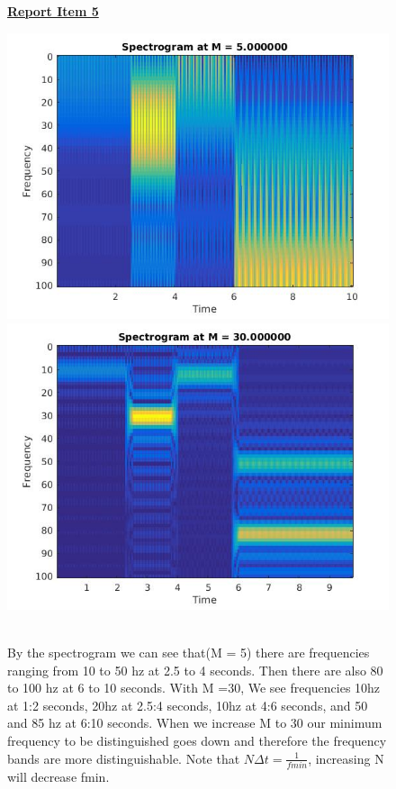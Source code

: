 \documentclass{article}
\begin{document}
\begin{figure}[H]
\color{red}
\underline{\textbf{Report Item 5}}
\color{black}

\includegraphics[scale = .4]{report5_1}
\includegraphics[scale = .4]{report5_2_2}
\end{figure}
\begin{figure}[H]
\\By the spectrogram we can see that(M = 5) there are frequencies ranging from 10 to 50 hz at 2.5 to 4 seconds. Then there are also 80 to 100 hz at 6 to 10 seconds. With M =30, We see frequencies 10hz at 1:2 seconds, 20hz at 2.5:4 seconds, 10hz at 4:6 seconds, and 50 and 85 hz at 6:10 seconds. When we increase M to 30 our minimum frequency to be distinguished goes down and therefore the frequency bands are more distinguishable. Note that $N\Delta t = \frac{1}{fmin}$, increasing N will decrease fmin.
\end{figure}
\end{document}
